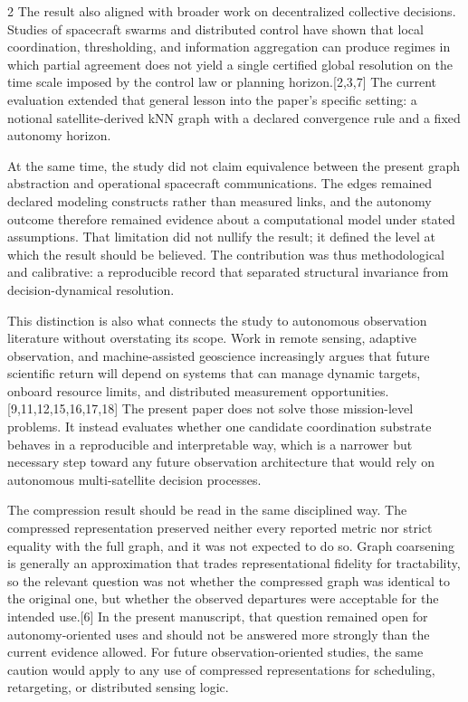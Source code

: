 \documentclass[fleqn,10pt,letterpaper]{article}
\begin{document}
\begin{multicols}{2}
The result also aligned with broader work on decentralized collective decisions. Studies of spacecraft swarms and distributed control have shown that local coordination, thresholding, and information aggregation can produce regimes in which partial agreement does not yield a single certified global resolution on the time scale imposed by the control law or planning horizon.[2,3,7] The current evaluation extended that general lesson into the paper's specific setting: a notional satellite-derived kNN graph with a declared convergence rule and a fixed autonomy horizon.

At the same time, the study did not claim equivalence between the present graph abstraction and operational spacecraft communications. The edges remained declared modeling constructs rather than measured links, and the autonomy outcome therefore remained evidence about a computational model under stated assumptions. That limitation did not nullify the result; it defined the level at which the result should be believed. The contribution was thus methodological and calibrative: a reproducible record that separated structural invariance from decision-dynamical resolution.

This distinction is also what connects the study to autonomous observation literature without overstating its scope. Work in remote sensing, adaptive observation, and machine-assisted geoscience increasingly argues that future scientific return will depend on systems that can manage dynamic targets, onboard resource limits, and distributed measurement opportunities.[9,11,12,15,16,17,18] The present paper does not solve those mission-level problems. It instead evaluates whether one candidate coordination substrate behaves in a reproducible and interpretable way, which is a narrower but necessary step toward any future observation architecture that would rely on autonomous multi-satellite decision processes.

The compression result should be read in the same disciplined way. The compressed representation preserved neither every reported metric nor strict equality with the full graph, and it was not expected to do so. Graph coarsening is generally an approximation that trades representational fidelity for tractability, so the relevant question was not whether the compressed graph was identical to the original one, but whether the observed departures were acceptable for the intended use.[6] In the present manuscript, that question remained open for autonomy-oriented uses and should not be answered more strongly than the current evidence allowed. For future observation-oriented studies, the same caution would apply to any use of compressed representations for scheduling, retargeting, or distributed sensing logic.



\end{multicols}
\end{document}
